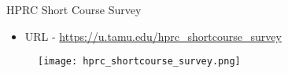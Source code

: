 \begin{frame}[fragile]{HPRC Short Course Survey}
\begin{itemize}
 \item URL - \url{https://u.tamu.edu/hprc_shortcourse_survey}
\end{itemize}

\begin{figure}
\centering
 \texttt{[image: hprc\_shortcourse\_survey.png]}
\end{figure}

\end{frame}
